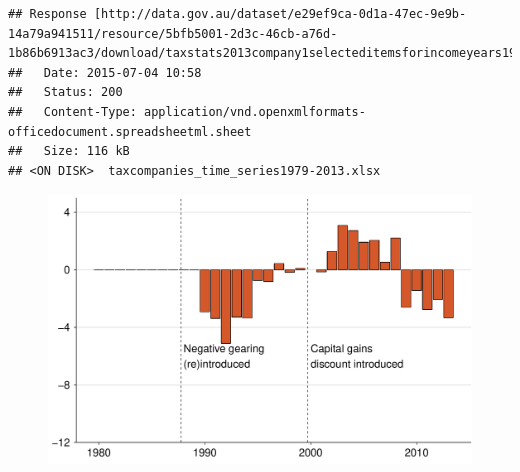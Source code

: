 \documentclass{grattan}\usepackage[]{graphicx}\usepackage[]{color}
\makeatletter
\newenvironment{kframe}{%
 \def\at@end@of@kframe{}%
 \ifinner\ifhmode%
  \def\at@end@of@kframe{\end{minipage}}%
  \begin{minipage}{\columnwidth}%
 \fi\fi%
 \def\FrameCommand##1{\hskip\@totalleftmargin \hskip-\fboxsep
 \colorbox{shadecolor}{##1}\hskip-\fboxsep
     \hskip-\linewidth \hskip-\@totalleftmargin \hskip\columnwidth}%
 \MakeFramed {\advance\hsize-\width
   \@totalleftmargin\z@ \linewidth\hsize
   \@setminipage}}%
 {\par\unskip\endMakeFramed%
 \at@end@of@kframe}
\newenvironment{knitrout}{}{} %
\makeatother
\begin{document}
\begin{knitrout}
\color{fgcolor}\begin{kframe}
\begin{verbatim}
## Response [http://data.gov.au/dataset/e29ef9ca-0d1a-47ec-9e9b-14a79a941511/resource/5bfb5001-2d3c-46cb-a76d-1b86b6913ac3/download/taxstats2013company1selecteditemsforincomeyears197980to201213.xlsx]
##   Date: 2015-07-04 10:58
##   Status: 200
##   Content-Type: application/vnd.openxmlformats-officedocument.spreadsheetml.sheet
##   Size: 116 kB
## <ON DISK>  taxcompanies_time_series1979-2013.xlsx
\end{verbatim}
\end{kframe}
\end{knitrout}


\begin{figure}[t]
\includegraphics[width=\columnwidth]{figure/Net_rent_over_time_companies-1}
\end{figure}
\end{document}
